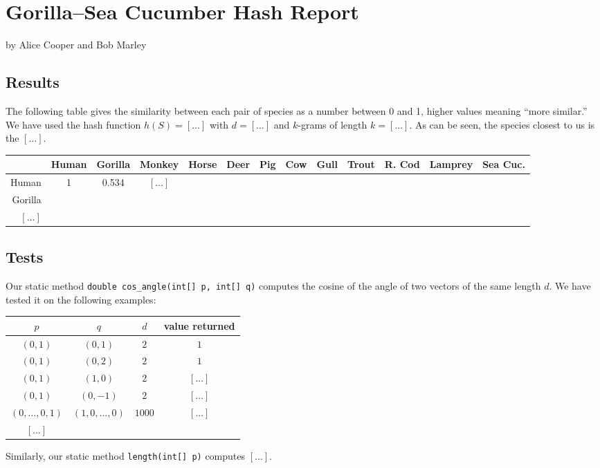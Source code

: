 \documentclass{tufte-handout}
\begin{document}
\newpage
\section{Gorilla--Sea Cucumber Hash Report}

by Alice Cooper and Bob Marley

  \subsection{Results}

  The following table gives the similarity between each pair of species as a number between 0 and 1, higher values meaning ``more similar.''
  We have used the hash function $h(S) = [\ldots]$ with  $d=[\ldots]$ and $k$-grams of length $k=[\ldots]$.
  As can be seen, the species closest to us is the $[\ldots]$.

  \bigskip\noindent
  {\small\sf
  \begin{tabular}{rcccccccccccc}
  \toprule
    &Human
    &Gorilla
    &Monkey
    &Horse
    &Deer
    &Pig
    &Cow
    &Gull
    &Trout
    &R. Cod
    &Lamprey
    &Sea Cuc.
    \\\midrule
  Human & 1 & 0.534 & $[\ldots]$ \\
  Gorilla &\\
  $[\ldots]$\\
  \bottomrule
  \end{tabular}
  }


  \subsection{Tests}

  Our static method {\tt double cos\_angle(int[] p, int[] q)} computes the cosine of the angle of two vectors of the same length $d$.
  We have tested it on the following examples:

  \bigskip\noindent
{ \small\sf
  \begin{tabular}{cccc}
  \toprule
  $p$     & $q$     & $d$ & value returned \\\midrule
  $(0,1)$ & $(0,1)$ & $2$ & $1$ \\
  $(0,1)$ & $(0,2)$ & $2$ & $1$\\
  $(0,1)$ & $(1,0)$ & $2$ & $[\ldots]$\\
  $(0,1)$ & $(0,-1)$ & $2$ & $[\ldots]$\\
  $(0,\ldots,0,1)$ & $(1,0,\ldots,0)$ & $1000$ & $[\ldots]$\\
  $[\ldots]$ \\
  \bottomrule
  \end{tabular}
}

\bigskip
  Similarly, our static method {\tt length(int[] p)} computes $[\ldots]$.
\end{document}
